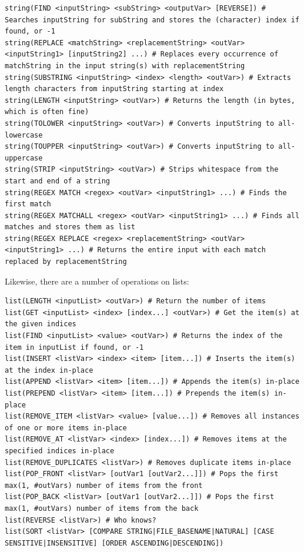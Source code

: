 \documentclass[table, xcdraw]{article}%
\begin{document}
\begin{verbatim}
string(FIND <inputString> <subString> <outputVar> [REVERSE]) # Searches inputString for subString and stores the (character) index if found, or -1
string(REPLACE <matchString> <replacementString> <outVar> <inputString1> [inputString2] ...) # Replaces every occurrence of matchString in the input string(s) with replacementString
string(SUBSTRING <inputString> <index> <length> <outVar>) # Extracts length characters from inputString starting at index
string(LENGTH <inputString> <outVar>) # Returns the length (in bytes, which is often fine)
string(TOLOWER <inputString> <outVar>) # Converts inputString to all-lowercase
string(TOUPPER <inputString> <outVar>) # Converts inputString to all-uppercase
string(STRIP <inputString> <outVar>) # Strips whitespace from the start and end of a string
string(REGEX MATCH <regex> <outVar> <inputString1> ...) # Finds the first match
string(REGEX MATCHALL <regex> <outVar> <inputString1> ...) # Finds all matches and stores them as list
string(REGEX REPLACE <regex> <replacementString> <outVar> <inputString1> ...) # Returns the entire input with each match replaced by replacementString
\end{verbatim}

Likewise, there are a number of operations on lists:

\begin{verbatim}
list(LENGTH <inputList> <outVar>) # Return the number of items
list(GET <inputList> <index> [index...] <outVar>) # Get the item(s) at the given indices
list(FIND <inputList> <value> <outVar>) # Returns the index of the item in inputList if found, or -1 
list(INSERT <listVar> <index> <item> [item...]) # Inserts the item(s) at the index in-place
list(APPEND <listVar> <item> [item...]) # Appends the item(s) in-place
list(PREPEND <listVar> <item> [item...]) # Prepends the item(s) in-place
list(REMOVE_ITEM <listVar> <value> [value...]) # Removes all instances of one or more items in-place
list(REMOVE_AT <listVar> <index> [index...]) # Removes items at the specified indices in-place
list(REMOVE_DUPLICATES <listVar>) # Removes duplicate items in-place
list(POP_FRONT <listVar> [outVar1 [outVar2...]]) # Pops the first max(1, #outVars) number of items from the front
list(POP_BACK <listVar> [outVar1 [outVar2...]]) # Pops the first max(1, #outVars) number of items from the back
list(REVERSE <listVar>) # Who knows?
list(SORT <listVar> [COMPARE STRING|FILE_BASENAME|NATURAL] [CASE SENSITIVE|INSENSITIVE] [ORDER ASCENDING|DESCENDING])
\end{verbatim}
\end{document}
